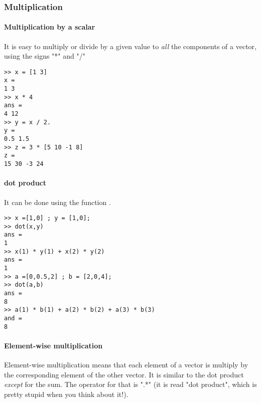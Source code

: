 


\subsubsection{Multiplication}
\paragraph{Multiplication by a scalar}

It is easy to multiply or divide by a given value to \emph{all} the components of a vector, using the signs "*" and "/"

\begin{lstlisting}
>> x = [1 3]
x = 
1 3
>> x * 4
ans =
4 12
>> y = x / 2.
y =
0.5 1.5
>> z = 3 * [5 10 -1 8]
z = 
15 30 -3 24
\end{lstlisting}



\paragraph{dot product}
It can be done using the function .
\begin{lstlisting}
>> x =[1,0] ; y = [1,0];
>> dot(x,y)
ans = 
1
>> x(1) * y(1) + x(2) * y(2)
ans =
1
>> a =[0,0.5,2] ; b = [2,0,4];
>> dot(a,b)
ans = 
8
>> a(1) * b(1) + a(2) * b(2) + a(3) * b(3)    
and =
8
\end{lstlisting}



\paragraph{Element-wise multiplication}
Element-wise multiplication means that each element of a vector is multiply by the corresponding element of the other vector.
It is similar to the dot product \emph{except} for the sum.
The operator for that is ".*" (it is read "dot product", which is pretty stupid when you think about it!).

